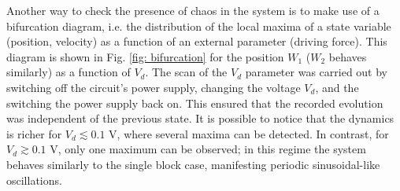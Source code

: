 Another way to check the presence of chaos in the system is to make use of a bifurcation diagram, i.e. the distribution
of the local maxima of a state variable (position, velocity) as a function of an external parameter (driving force).
This diagram is shown in Fig. \ref{fig: bifurcation} for the position $W_1$ ($W_2$ behaves similarly) as a function of $V_d$.
The scan of the $V_d$ parameter was carried out by switching off the circuit's power supply, changing the voltage $V_d$,
and the switching the power supply back on. This ensured that the recorded evolution was independent of the previous state.
It is possible to notice that the dynamics is richer for $V_d\lesssim0.1$ V, where several maxima can be detected.
In contrast, for $V_d\gtrsim0.1$ V, only one maximum can be observed; in this regime the system behaves similarly
to the single block case, manifesting periodic sinusoidal-like oscillations.

